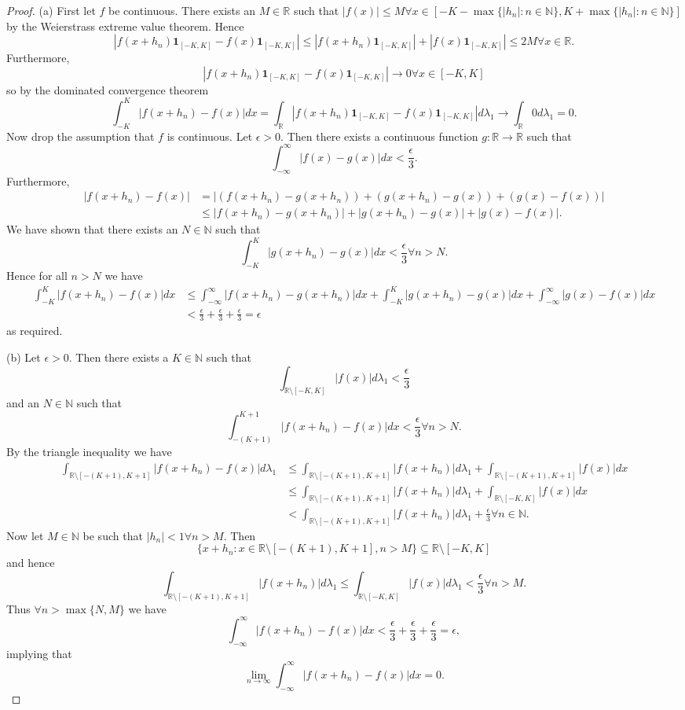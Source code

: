 \documentclass{article}
\begin{document}
\begin{proof}
\item[(a)] First let $f$ be continuous. There exists an $M\in\mathbb{R}$ such that $|f(x)|\leq M\forall x\in[-K-\max\{|h_n|:n\in\mathbb{N}\},K+\max\{|h_n|:n\in\mathbb{N}\}]$ by the Weierstrass extreme value theorem. Hence \[|f(x+h_n)\mathbf{1}_{[-K,K]}-f(x)\mathbf{1}_{[-K,K]}|\leq|f(x+h_n)\mathbf{1}_{[-K,K]}|+|f(x)\mathbf{1}_{[-K,K]}|\leq 2M\forall x\in\mathbb{R}.\]Furthermore, \[|f(x+h_n)\mathbf{1}_{[-K,K]}-f(x)\mathbf{1}_{[-K,K]}|\to0\forall x\in [-K,K]\] so by the dominated convergence theorem\[\int_{-K}^K|f(x+h_n)-f(x)|dx=\int_\mathbb{R}|f(x+h_n)\mathbf{1}_{[-K,K]}-f(x)\mathbf{1}_{[-K,K]}|d\lambda_1\to\int_\mathbb{R}0d\lambda_1=0.\]Now drop the assumption that $f$ is continuous. Let $\epsilon>0$. Then there exists a continuous function $g:\mathbb{R}\to\mathbb{R}$ such that \[\int_{-\infty}^\infty|f(x)-g(x)|dx<\frac{\epsilon}{3}.\]Furthermore, \begin{align*}|f(x+h_n)-f(x)|&=|(f(x+h_n)-g(x+h_n))+(g(x+h_n)-g(x))+(g(x)-f(x))|\\&\leq|f(x+h_n)-g(x+h_n)|+|g(x+h_n)-g(x)|+|g(x)-f(x)|.\end{align*}We have shown that there exists an $N\in\mathbb{N}$ such that \[\int_{-K}^K|g(x+h_n)-g(x)|dx<\frac{\epsilon}{3}\forall n> N.\]Hence for all $n>N$ we have\begin{align*}\int_{-K}^K|f(x+h_n)-f(x)|dx&\leq\int_{-\infty}^\infty|f(x+h_n)-g(x+h_n)|dx+\int_{-K}^K|g(x+h_n)-g(x)|dx+\int_{-\infty}^\infty|g(x)-f(x)|dx\\&<\frac{\epsilon}{3}+\frac{\epsilon}{3}+\frac{\epsilon}{3}=\epsilon\end{align*} as required.
\item[(b)] Let $\epsilon>0$. Then there exists a $K\in\mathbb{N}$ such that \[\int_{\mathbb{R}\setminus[-K,K]}|f(x)|d\lambda_1<\frac{\epsilon}{3}\] and an $N\in\mathbb{N}$ such that \[\int_{-(K+1)}^{K+1}|f(x+h_n)-f(x)|dx<\frac{\epsilon}{3}\forall n>N.\]By the triangle inequality we have\begin{align*}\int_{\mathbb{R}\setminus[-(K+1),K+1]}|f(x+h_n)-f(x)|d\lambda_1&\leq\int_{\mathbb{R}\setminus[-(K+1),K+1]}|f(x+h_n)|d\lambda_1+\int_{\mathbb{R}\setminus[-(K+1),K+1]}|f(x)|dx\\&\leq\int_{\mathbb{R}\setminus[-(K+1),K+1]}|f(x+h_n)|d\lambda_1+\int_{\mathbb{R}\setminus[-K,K]}|f(x)|dx\\&<\int_{\mathbb{R}\setminus[-(K+1),K+1]}|f(x+h_n)|d\lambda_1+\frac{\epsilon}{3}\forall n\in\mathbb{N}.\end{align*}Now let $M\in\mathbb{N}$ be such that $|h_n|<1\forall n>M$. Then \[\{x+h_n:x\in\mathbb{R}\setminus[-(K+1),K+1],n>M\}\subseteq\mathbb{R}\setminus[-K,K]\] and hence\[\int_{\mathbb{R}\setminus[-(K+1),K+1]}|f(x+h_n)|d\lambda_1\leq\int_{\mathbb{R}\setminus[-K,K]}|f(x)|d\lambda_1<\frac{\epsilon}{3}\forall n>M.\] Thus $\forall n>\max\{N,M\}$ we have\[\int_{-\infty}^\infty|f(x+h_n)-f(x)|dx<\frac{\epsilon}{3}+\frac{\epsilon}{3}+\frac{\epsilon}{3}=\epsilon,\] implying that \[\lim_{n\to\infty}\int_{-\infty}^\infty|f(x+h_n)-f(x)|dx=0.\]
\end{proof}
\end{document}
